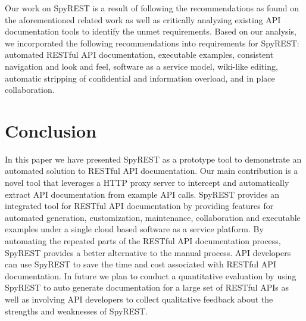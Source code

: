 \documentclass[conference]{IEEEtran}
\begin{document}
Our work on SpyREST is a result of following the recommendations as found on the aforementioned related work as well as critically analyzing existing API documentation tools to identify the unmet requirements. Based on our analysis, we incorporated the following recommendations into requirements for SpyREST: automated RESTful API documentation, executable examples, consistent navigation and look and feel, software as a service model, wiki-like editing, automatic stripping of confidential and information overload, and in place collaboration.

\section{Conclusion}
In this paper we have presented SpyREST as a prototype tool to demonstrate an automated solution to RESTful API documentation. Our main contribution is a novel tool that leverages a HTTP proxy server to intercept and automatically extract API documentation from example API calls. SpyREST provides an integrated tool for RESTful API documentation by providing features for automated generation, customization, maintenance, collaboration and executable examples under a single cloud based software as a service platform. By automating the repeated parts of the RESTful API documentation process, SpyREST provides a better alternative to the manual process. API developers can use SpyREST to save the time and cost associated with RESTful API documentation. In future we plan to conduct a quantitative evaluation by using SpyREST to auto generate documentation for a large set of RESTful APIs as well as involving API developers to collect qualitative feedback about the strengths and weaknesses of SpyREST.



\end{document}
